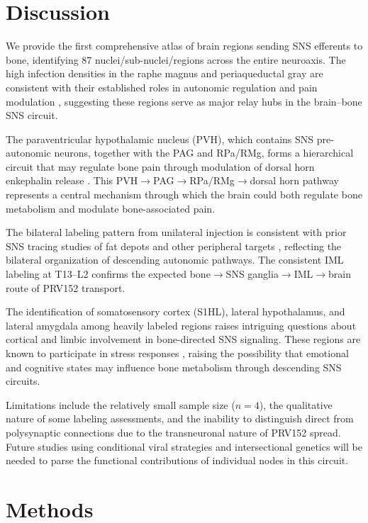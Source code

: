 \documentclass[11pt]{article}
\begin{document}
\section{Discussion}

We provide the first comprehensive atlas of brain regions sending SNS efferents to bone, identifying 87 nuclei/sub-nuclei/regions across the entire neuroaxis. The high infection densities in the raphe magnus and periaqueductal gray are consistent with their established roles in autonomic regulation and pain modulation \citep{basbaum2009, morrison2001}, suggesting these regions serve as major relay hubs in the brain--bone SNS circuit.

The paraventricular hypothalamic nucleus (PVH), which contains SNS pre-autonomic neurons, together with the PAG and RPa/RMg, forms a hierarchical circuit that may regulate bone pain through modulation of dorsal horn enkephalin release \citep{mantyh2014, sohn2017}. This PVH$\rightarrow$PAG$\rightarrow$RPa/RMg$\rightarrow$dorsal horn pathway represents a central mechanism through which the brain could both regulate bone metabolism and modulate bone-associated pain.

The bilateral labeling pattern from unilateral injection is consistent with prior SNS tracing studies of fat depots and other peripheral targets \citep{card2011}, reflecting the bilateral organization of descending autonomic pathways. The consistent IML labeling at T13--L2 confirms the expected bone$\rightarrow$SNS ganglia$\rightarrow$IML$\rightarrow$brain route of PRV152 transport.

The identification of somatosensory cortex (S1HL), lateral hypothalamus, and lateral amygdala among heavily labeled regions raises intriguing questions about cortical and limbic involvement in bone-directed SNS signaling. These regions are known to participate in stress responses \citep{stanfield2019}, raising the possibility that emotional and cognitive states may influence bone metabolism through descending SNS circuits.

Limitations include the relatively small sample size ($n = 4$), the qualitative nature of some labeling assessments, and the inability to distinguish direct from polysynaptic connections due to the transneuronal nature of PRV152 spread. Future studies using conditional viral strategies and intersectional genetics will be needed to parse the functional contributions of individual nodes in this circuit.

\section{Methods}
\end{document}
